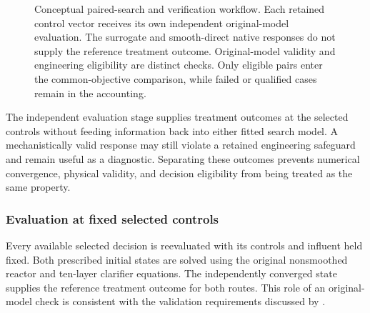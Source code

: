 \begin{figure}[htbp]
\caption{Conceptual paired-search and verification workflow. Each retained control vector receives its own independent original-model evaluation. The surrogate and smooth-direct native responses do not supply the reference treatment outcome. Original-model validity and engineering eligibility are distinct checks. Only eligible pairs enter the common-objective comparison, while failed or qualified cases remain in the accounting.}
\label{fig:plant_route_verification}
\end{figure}

The independent evaluation stage supplies treatment outcomes at the selected controls without feeding information back into either fitted search model. A mechanistically valid response may still violate a retained engineering safeguard and remain useful as a diagnostic. Separating these outcomes prevents numerical convergence, physical validity, and decision eligibility from being treated as the same property.

\subsubsection{Evaluation at fixed selected controls}

Every available selected decision is reevaluated with its controls and influent held fixed. Both prescribed initial states are solved using the original nonsmoothed reactor and ten-layer clarifier equations. The independently converged state supplies the reference treatment outcome for both routes. This role of an original-model check is consistent with the validation requirements discussed by \citet{BhosekarIerapetritou2018}.

